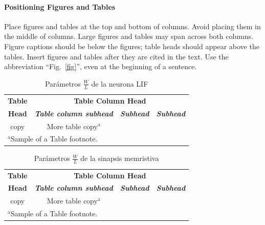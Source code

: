 \documentclass[conference]{IEEEtran}
\begin{document}
\paragraph{Positioning Figures and Tables} Place figures and tables at the top and 
bottom of columns. Avoid placing them in the middle of columns. Large 
figures and tables may span across both columns. Figure captions should be 
below the figures; table heads should appear above the tables. Insert 
figures and tables after they are cited in the text. Use the abbreviation 
``Fig.~\ref{fig}'', even at the beginning of a sentence.

\begin{table}[htbp]
\caption{Parámetros $\frac{W}{L}$ de la neurona LIF}
\begin{center}
\begin{tabular}{|c|c|c|c|}
\hline
\textbf{Table}&\multicolumn{3}{|c|}{\textbf{Table Column Head}} \\
\cline{2-4} 
\textbf{Head} & \textbf{\textit{Table column subhead}}& \textbf{\textit{Subhead}}& \textbf{\textit{Subhead}} \\
\hline
copy& More table copy$^{\mathrm{a}}$& &  \\
\hline
\multicolumn{4}{l}{$^{\mathrm{a}}$Sample of a Table footnote.}
\end{tabular}
\label{tab1}
\end{center}
\end{table}

\begin{table}[htbp]
\caption{Parámetros $\frac{W}{L}$ de la sinapsis memristiva}
\begin{center}
\begin{tabular}{|c|c|c|c|}
\hline
\textbf{Table}&\multicolumn{3}{|c|}{\textbf{Table Column Head}} \\
\cline{2-4} 
\textbf{Head} & \textbf{\textit{Table column subhead}}& \textbf{\textit{Subhead}}& \textbf{\textit{Subhead}} \\
\hline
copy& More table copy$^{\mathrm{a}}$& &  \\
\hline
\multicolumn{4}{l}{$^{\mathrm{a}}$Sample of a Table footnote.}
\end{tabular}
\label{tab1}
\end{center}
\end{table}
\end{document}
